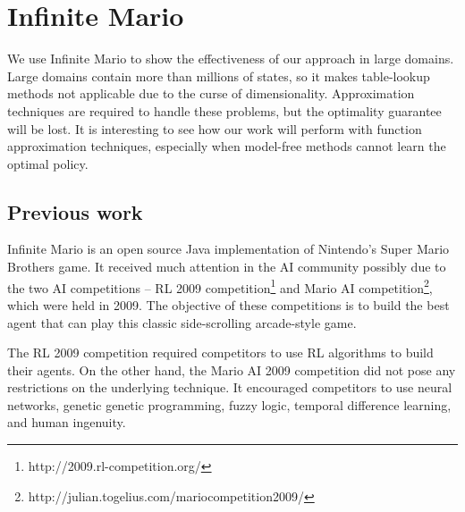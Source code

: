 \vfill
\clearpage





\section{Infinite Mario}
\label{se:MarioExp}
We use Infinite Mario to show the effectiveness of our approach in large domains. 
Large domains contain more than millions of states, so it makes table-lookup methods not applicable
due to the curse of dimensionality. Approximation techniques are required to handle these
problems, but the optimality guarantee will be lost.
It is interesting to see how our work will perform with function approximation techniques,
especially when model-free methods cannot learn the optimal policy.

\subsection{Previous work}
Infinite Mario is an open source Java implementation of Nintendo's Super Mario Brothers game.
It received much attention in the AI community possibly due to
the two AI competitions -- RL 2009 competition\footnote{http://2009.rl-competition.org/}
and Mario AI competition\footnote{http://julian.togelius.com/mariocompetition2009/}, which were held in 2009.
The objective of these competitions is to build the best agent that
can play this classic side-scrolling arcade-style game.


The RL 2009 competition required competitors to use RL algorithms to build their agents.
On the other hand, the Mario AI 2009 competition \cite{Robin09} 
did not pose any restrictions on the underlying technique.
It encouraged
competitors to use neural networks, genetic genetic programming, fuzzy logic, temporal difference learning, and human ingenuity.

